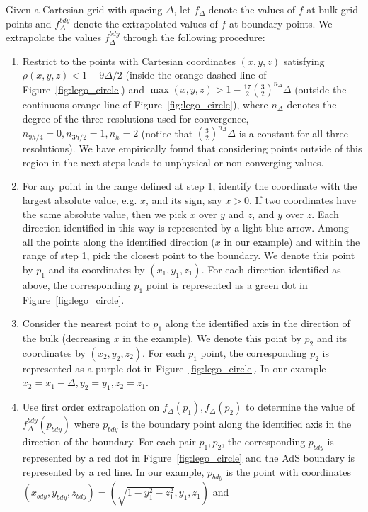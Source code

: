 \documentclass[a4paper,11pt]{article}
\numberwithin{equation}{section}
\begin{document}
Given a Cartesian grid with spacing $\Delta$, let $f_\Delta$ denote the values of $f$ at bulk grid points and $f^{bdy}_{\Delta}$ denote the extrapolated values of $f$ at boundary points. 
We extrapolate the values $f^{bdy}_{\Delta}$ through the following procedure:
 \begin{enumerate}
 \item Restrict to the points with Cartesian coordinates $(x,y,z)$ satisfying $\rho(x,y,z)<1-9\Delta/2$ (inside the orange dashed line of Figure~\ref{fig:lego_circle}) and $\max(x,y,z)>1-\frac{17}{2}\left(\frac{3}{2}\right)^{n_\Delta}\Delta$ (outside the continuous orange line of Figure~\ref{fig:lego_circle}), where $n_\Delta$ denotes the degree of the three resolutions used for convergence, $n_{9h/4}=0,n_{3h/2}=1,n_{h}=2$ (notice that $\left(\frac{3}{2}\right)^{n_\Delta}\Delta$ is a constant for all three resolutions). We have empirically found that considering points outside of this region in the next steps leads to unphysical or non-converging values.
 \item For any point in the range defined at step 1, identify the coordinate with the largest absolute value, e.g. $x$, and its sign, say $x>0$. If two coordinates have the same absolute value, then we pick $x$ over $y$ and $z$, and $y$ over $z$. Each direction identified in this way is represented by a light blue arrow. Among all the points along the identified direction ($x$ in our example) and within the range of step 1, pick the closest point to the boundary. We denote this point by $p_1$ and its coordinates by $(x_1,y_1,z_1)$. For each direction identified as above, the corresponding $p_1$ point is represented as a green dot in Figure~\ref{fig:lego_circle}.
 \item Consider the nearest point to $p_1$ along the identified axis in the direction of the bulk (decreasing $x$ in the example). We denote this point by $p_2$ and its coordinates by $(x_2,y_2,z_2)$. For each $p_1$ point, the corresponding $p_2$ is represented as a purple dot in Figure~\ref{fig:lego_circle}. In our example $x_2=x_1-\Delta,y_2=y_1,z_2=z_1$.
 \item Use first order extrapolation on $f_\Delta(p_1),f_\Delta(p_{2})$ to determine the value of $f^{bdy}_{\Delta}(p_{bdy})$ where $p_{bdy}$ is the boundary point along the identified axis in the direction of the boundary.  
For each pair $p_1,p_2$, the corresponding $p_{bdy}$ is represented by a red dot in Figure~\ref{fig:lego_circle} and the AdS boundary is represented by a red line.
In our example, $p_{bdy}$ is the point with coordinates $(x_{bdy},y_{bdy},z_{bdy})=(\sqrt{1-y_1^2-z_1^2},y_1,z_1)$ and

\end{enumerate}
\end{document}
